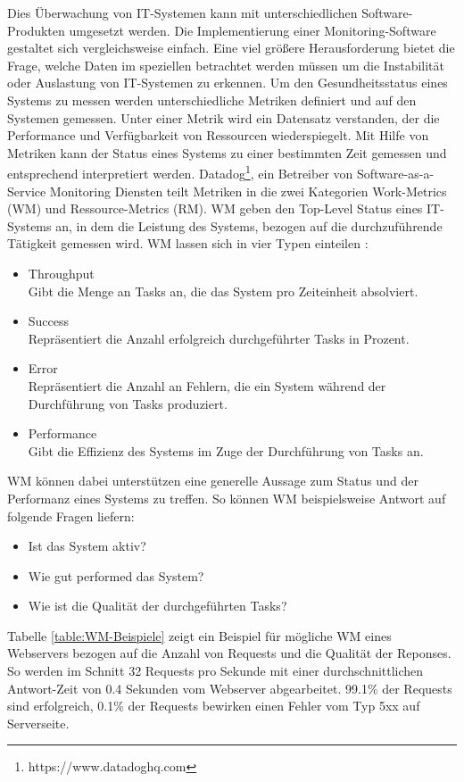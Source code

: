\bigbreak
Dies Überwachung von IT-Systemen kann mit unterschiedlichen Software-Produkten umgesetzt werden. Die Implementierung einer Monitoring-Software gestaltet sich vergleichsweise einfach. Eine viel größere Herausforderung bietet die Frage, welche Daten im speziellen betrachtet werden müssen um die Instabilität oder Auslastung von IT-Systemen zu erkennen. Um den Gesundheitsstatus eines Systems zu messen werden unterschiedliche Metriken definiert und auf den Systemen gemessen. Unter einer Metrik wird ein Datensatz verstanden, der die Performance und Verfügbarkeit von Ressourcen wiederspiegelt. Mit Hilfe von Metriken kann der Status eines Systems zu einer bestimmten Zeit gemessen und entsprechend interpretiert werden. \autocite{geißler_2019} 
\bigbreak
Datadog\footnote{https://www.datadoghq.com}, ein Betreiber von Software-as-a-Service Monitoring Diensten teilt Metriken in die zwei Kategorien \glqq{}Work-Metrics\grqq{} (WM) und \glqq{}Ressource-Metrics\grqq{} (RM). WM geben den Top-Level Status eines IT-Systems an, in dem die Leistung des Systems, bezogen auf die durchzuführende Tätigkeit gemessen wird. 
\bigbreak
WM lassen sich in vier Typen einteilen \autocite{le-quoc_2015}:
\begin{itemize}
    \item Throughput\\
    Gibt die Menge an Tasks an, die das System pro Zeiteinheit absolviert.
    \item Success\\
    Repräsentiert die Anzahl erfolgreich durchgeführter Tasks in Prozent.
    \item Error\\
    Repräsentiert die Anzahl an Fehlern, die ein System während der Durchführung von Tasks produziert.
    \item Performance\\
    Gibt die Effizienz des Systems im Zuge der Durchführung von Tasks an. 
\end{itemize}
\bigbreak
WM können dabei unterstützen eine generelle Aussage zum Status und der Performanz eines Systems zu treffen. So können WM beispielsweise Antwort auf folgende Fragen liefern:
\begin{itemize}
    \item Ist das System aktiv?
    \item Wie gut performed das System?
    \item Wie ist die Qualität der durchgeführten Tasks?
\end{itemize}
\bigbreak
Tabelle \ref{table:WM-Beispiele} zeigt ein Beispiel für mögliche WM eines Webservers bezogen auf die Anzahl von Requests und die Qualität der Reponses.\\ So werden im Schnitt 32 Requests pro Sekunde mit einer durchschnittlichen Antwort-Zeit von 0.4 Sekunden vom Webserver abgearbeitet. 99.1\% der Requests sind erfolgreich, 0.1\% der Requests bewirken einen Fehler vom Typ 5xx auf Serverseite. 
